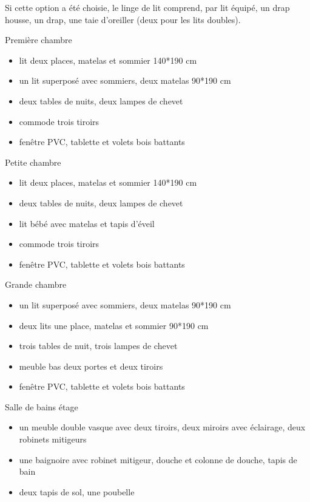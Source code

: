 \documentclass[a4paper,11pt]{article}
\begin{document}
Si cette option a été choisie, le linge de lit comprend, par lit équipé, un drap housse, un drap, une taie d'oreiller (deux pour les lits doubles).
\vspace{0.5cm}


\vspace{0.25cm}

Première chambre
\begin{itemize}
\item lit deux places, matelas et sommier 140*190 cm
\item un lit superposé avec sommiers, deux matelas 90*190 cm
\item deux tables de nuits, deux lampes de chevet
\item commode trois tiroirs
\item fenêtre PVC, tablette et volets bois battants
\end{itemize}

\vspace{0.5cm}

Petite chambre
\begin{itemize}
\item lit deux places, matelas et sommier 140*190 cm
\item deux tables de nuits, deux lampes de chevet
\item lit bébé avec matelas et tapis d'éveil
\item commode trois tiroirs
\item fenêtre PVC, tablette et volets bois battants
\end{itemize}


\vspace{0.25cm}

Grande chambre
\begin{itemize}
\item un lit superposé avec sommiers, deux matelas 90*190 cm
\item deux lits une place, matelas et sommier 90*190 cm
\item trois tables de nuit, trois lampes de chevet
\item meuble bas deux portes et deux tiroirs
\item fenêtre PVC, tablette et volets bois battants
\end{itemize}
\vspace{0.25cm}

Salle de bains étage
\begin{itemize}
\item un meuble double vasque avec deux tiroirs, deux miroirs avec éclairage, deux robinets mitigeurs
\item une baignoire avec robinet mitigeur, douche et colonne de douche, tapis de bain
\item deux tapis de sol, une poubelle
\end{itemize}
\end{document}
